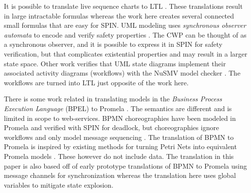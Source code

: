 It is possible to translate live sequence charts to LTL \cite{KUMAR, KUMAR2009137}. These translations result in large intractable formulas whereas the work here creates several connected small formulas that are easy for SPIN. UML modeling uses \emph{synchronous observer automata} to encode and verify safety properties \cite{8906967}. The CWP can be thought of as a synchronous observer, and it is possible to express it in SPIN for safety verification, but that complicates existential properties and may result in a larger state space. Other work verifies that UML state diagrams implement their associated activity diagrams (workflows) with the NuSMV model checker \cite{7436156}. The workflows are turned into LTL just opposite of the work here.

There is some work related in translating models in the \emph{Business Process Execution Language} (BPEL) to Promela \cite{bpelToPromela}. The semantics are different and is limited in scope to web-services. BPMN choreographies have been modeled in Promela and verified with SPIN for deadlock, but choreographies ignore workflows and only model message sequencing \cite{choreography}. The translation of BPMN to Promela is inspired by existing methods for turning Petri Nets into equivalent Promela models \cite{petrinetToPromela, petrinetInspiration}. These however do not include data. The translation in this paper is also based off of early prototype translations of BPMN to Promela using message channels for synchronization \cite{bpmn2promela} whereas the translation here uses global variables to mitigate state explosion.